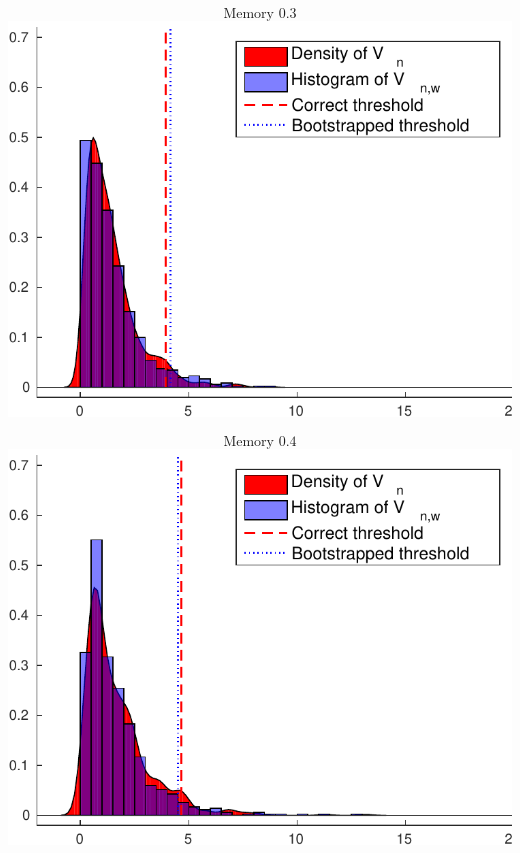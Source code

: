 \documentclass[landscape,a0]{a0poster_csml_v2}
\begin{document}
\begin{poster}
\begin{PosterColumn}
\begin{minipage}[c]{0.24\textwidth} $$\text{Memory } 0.3$$
\includegraphics[width=\textwidth]{../img/wild_ecdf3.pdf} 
\end{minipage}
\begin{minipage}[c]{0.24\textwidth} $$\text{Memory } 0.4$$
\includegraphics[width=\textwidth]{../img/wild_ecdf4.pdf} 
\end{minipage}


\end{PosterColumn}
\end{poster}
\end{document}
